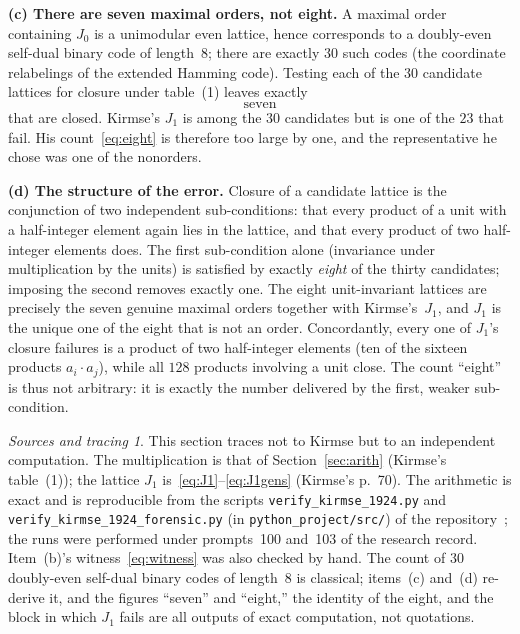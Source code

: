 \documentclass[11pt]{amsart}
\numberwithin{equation}{section}
\theoremstyle{definition}
\theoremstyle{plain}
\theoremstyle{remark}
\newtheorem*{tracing}{Sources and tracing}
\begin{document}
\medskip\noindent\textbf{(c) There are seven maximal orders, not eight.}  A
maximal order containing $J_0$ is a unimodular even lattice, hence
corresponds to a doubly-even self-dual binary code of length~$8$; there are
exactly $30$ such codes (the coordinate relabelings of the extended Hamming
code).  Testing each of the $30$ candidate lattices for closure under
table~(1) leaves exactly
\[
  \boxed{\ \text{seven}\ }
\]
that are closed.  Kirmse's $J_1$ is among the $30$ candidates but is one of
the $23$ that fail.  His count~\eqref{eq:eight} is therefore too large by
one, and the representative he chose was one of the nonorders.

\medskip\noindent\textbf{(d) The structure of the error.}  Closure of a
candidate lattice is the conjunction of two independent sub-conditions: that
every product of a unit with a half-integer element again lies in the
lattice, and that every product of two half-integer elements does.  The
first sub-condition alone (invariance under multiplication by the units)
is satisfied by exactly \emph{eight} of the thirty candidates; imposing
the second removes exactly one.  The eight unit-invariant lattices are
precisely the seven genuine maximal orders together with Kirmse's~$J_1$, and
$J_1$ is the unique one of the eight that is not an order.  Concordantly,
every one of $J_1$'s closure failures is a product of two half-integer
elements (ten of the sixteen products $a_i\cdot a_j$), while all $128$
products involving a unit close.  The count ``eight'' is thus not arbitrary:
it is exactly the number delivered by the first, weaker sub-condition.

\begin{tracing}
This section traces not to Kirmse but to an independent computation.  The
multiplication is that of Section~\ref{sec:arith} (Kirmse's table~(1));
the lattice $J_1$ is~\eqref{eq:J1}--\eqref{eq:J1gens} (Kirmse's p.~70).  The
arithmetic is exact and is reproducible from the scripts
\texttt{verify\_kirmse\_1924.py} and \texttt{verify\_kirmse\_1924\_forensic.py}
(in \texttt{python\_project/src/}) of the repository~\cite{repo}; the runs
were performed under prompts~100 and~103 of the research record.  Item~(b)'s
witness~\eqref{eq:witness} was also checked by hand.  The count of $30$
doubly-even self-dual binary codes of length~$8$ is classical; items~(c)
and~(d) re-derive it, and the figures ``seven'' and ``eight,'' the identity
of the eight, and the block in which $J_1$ fails are all outputs of exact
computation, not quotations.
\end{tracing}
\end{document}
